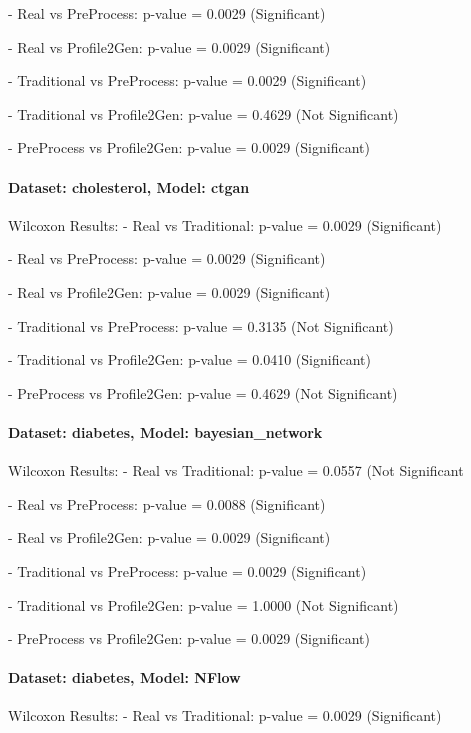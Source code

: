\documentclass{article}
\theoremstyle{plain}
\theoremstyle{definition}
\theoremstyle{remark}
\begin{document}
- Real vs PreProcess: p-value = 0.0029 (Significant)


- Real vs Profile2Gen: p-value = 0.0029 (Significant)


- Traditional vs PreProcess: p-value = 0.0029 (Significant)


- Traditional vs Profile2Gen: p-value = 0.4629 (Not Significant)


- PreProcess vs Profile2Gen: p-value = 0.0029 (Significant)



\paragraph{Dataset: cholesterol, Model: ctgan}
Wilcoxon Results:
- Real vs Traditional: p-value = 0.0029 (Significant)


- Real vs PreProcess: p-value = 0.0029 (Significant)


- Real vs Profile2Gen: p-value = 0.0029 (Significant)


- Traditional vs PreProcess: p-value = 0.3135 (Not Significant)


- Traditional vs Profile2Gen: p-value = 0.0410 (Significant)


- PreProcess vs Profile2Gen: p-value = 0.4629 (Not Significant)



\paragraph{Dataset: diabetes, Model: bayesian\_network}
Wilcoxon Results:
- Real vs Traditional: p-value = 0.0557 (Not Significant


- Real vs PreProcess: p-value = 0.0088 (Significant)


- Real vs Profile2Gen: p-value = 0.0029 (Significant)


- Traditional vs PreProcess: p-value = 0.0029 (Significant)


- Traditional vs Profile2Gen: p-value = 1.0000 (Not Significant)


- PreProcess vs Profile2Gen: p-value = 0.0029 (Significant)



\paragraph{Dataset: diabetes, Model: NFlow}
Wilcoxon Results:
- Real vs Traditional: p-value = 0.0029 (Significant)
\end{document}
